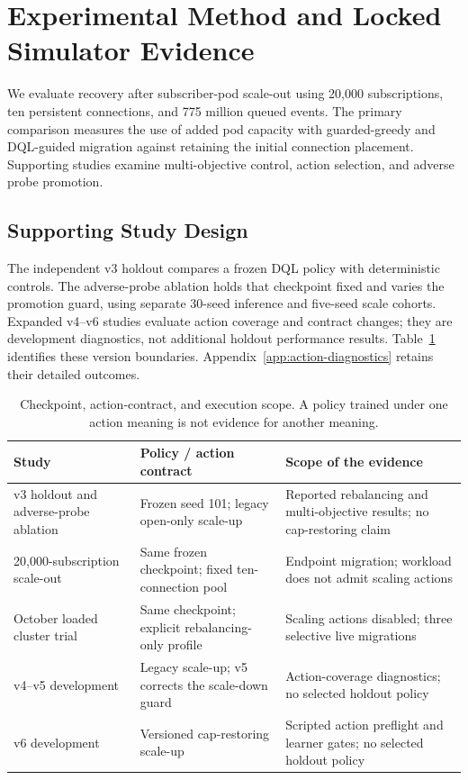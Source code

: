 \section{Experimental Method and Locked Simulator Evidence}
\label{sec:locked-evidence}

We evaluate recovery after subscriber-pod scale-out using 20,000 subscriptions,
ten persistent connections, and 775 million queued events. The primary
comparison measures the use of added pod capacity with guarded-greedy and
DQL-guided migration against retaining the initial connection placement. Supporting studies examine
multi-objective control, action selection, and adverse probe promotion.



\subsection{Supporting Study Design}

The independent v3 holdout compares a frozen DQL policy with deterministic
controls. The adverse-probe ablation holds that checkpoint fixed and varies
the promotion guard, using separate 30-seed inference and five-seed scale
cohorts. Expanded v4--v6 studies evaluate action coverage and contract changes;
they are development diagnostics, not additional holdout performance results.
Table~\ref{tab:action-contract-map} identifies these version boundaries.
Appendix~\ref{app:action-diagnostics} retains their detailed outcomes.

\begin{table}[!htbp]
\centering\small
\caption{Checkpoint, action-contract, and execution scope. A policy trained
under one action meaning is not evidence for another meaning.}
\label{tab:action-contract-map}
\begin{tabular}{p{}p{}p{}}
\toprule
Study & Policy / action contract & Scope of the evidence\\
\midrule
v3 holdout and adverse-probe ablation & Frozen seed 101; legacy open-only scale-up & Reported rebalancing and multi-objective results; no cap-restoring claim\\
20,000-subscription scale-out & Same frozen checkpoint; fixed ten-connection pool & Endpoint migration; workload does not admit scaling actions\\
October loaded cluster trial & Same checkpoint; explicit rebalancing-only profile & Scaling actions disabled; three selective live migrations\\
v4--v5 development & Legacy scale-up; v5 corrects the scale-down guard & Action-coverage diagnostics; no selected holdout policy\\
v6 development & Versioned cap-restoring scale-up & Scripted action preflight and learner gates; no selected holdout policy\\
\bottomrule
\end{tabular}
\end{table}

